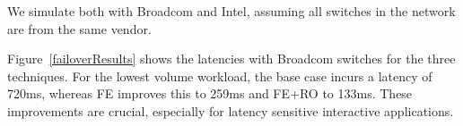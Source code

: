 



We simulate both with Broadcom and Intel, assuming all switches in the network are from the same vendor.



Figure~\ref{failoverResults} shows the latencies with Broadcom switches for the three techniques. For the lowest volume workload, the base case incurs a latency of 720ms, whereas FE improves this to 259ms and FE+RO to 133ms. These improvements are crucial, especially for latency sensitive interactive applications.

